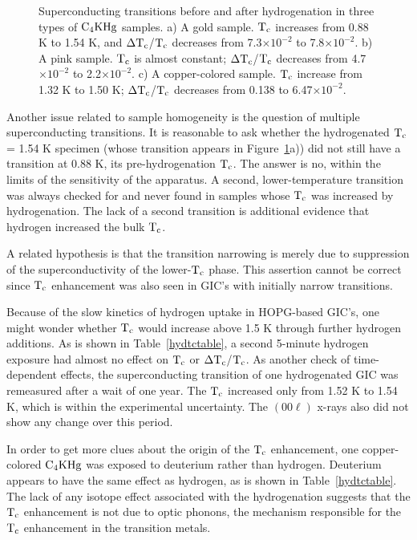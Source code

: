 \begin{figure}
\vspace{20cm}
\caption[Superconducting transitions before and after hydrogenation in $\rm
C_4KHg$]{Superconducting  transitions before  and  after  hydrogenation  in
three  types  of  $\rm C_4KHg$  samples.   a)  A  gold  sample.   $\rm T_c$
increases from 0.88 K to 1.54 K,  and  $\rm \Delta T_c$/$\rm T_c$ decreases
from 7.3$\times 10^{-2}$ to 7.8$\times 10^{-2}$.  b) A pink sample.  $\rm
T_c$  is  almost  constant; $\rm   \Delta  T_c$/$\rm   T_c$ decreases  from
4.7$\times 10^{-2}$ to 2.2$\times  10^{-2}$.  c) A copper-colored sample.
$\rm T_c$ increase   from 1.32 K  to 1.50  K;  $\rm  \Delta  T_c$/$\rm T_c$
decreases from 0.138 to 6.47$\times 10^{-2}$.}
\label{hydeffect}
\end{figure}

        Another  issue related to sample  homogeneity  is  the question  of
multiple superconducting transitions.  It is  reasonable to ask whether the
hydrogenated $\rm T_c$  = 1.54  K  specimen  (whose transition  appears  in
Figure~\ref{hydeffect}a))  did not still  have  a transition at 0.88 K, its
pre-hydrogenation  $\rm T_c$.  The  answer is no, within  the limits of the
sensitivity of  the apparatus.  A second, lower-temperature  transition was
always checked for and never found in samples whose $\rm T_c$ was increased
by hydrogenation.  The lack  of  a second transition is additional evidence
that hydrogen increased the bulk $\rm T_c$.

        A related hypothesis is that the transition narrowing is merely due
to suppression of the superconductivity of the lower-$\rm T_c$ phase.  This
assertion cannot be  correct since $\rm T_c$  enhancement was also  seen in
GIC's with initially narrow transitions.

        Because   of  the slow kinetics   of  hydrogen uptake in HOPG-based
GIC's,  one might  wonder whether $\rm  T_c$ would  increase   above 1.5  K
through further hydrogen additions.  As is shown in Table~\ref{hydtctable},
a second 5-minute  hydrogen exposure had  almost no effect  on $\rm T_c$ or
$\rm \Delta T_c$/$\rm T_c$.   As  another check  of time-dependent effects,
the superconducting transition of one hydrogenated GIC was remeasured after
a wait of one year.  The $\rm  T_c$ increased only  from 1.52 K  to 1.54 K,
which  is within the experimental  uncertainty.  The $(00\ell)$ x-rays also
did not show any change over this period.

        In order   to get more  clues  about the  origin  of the  $\rm T_c$
enhancement,  one copper-colored  $\rm  C_4KHg$  was  exposed  to deuterium
rather than  hydrogen.  Deuterium  appears    to have the  same effect   as
hydrogen, as is shown in Table~\ref{hydtctable}.   The lack of  any isotope
effect associated  with  the  hydrogenation suggests that   the  $\rm  T_c$
enhancement is not due to optic phonons, the mechanism  responsible for the
$\rm T_c$ enhancement in the transition metals.\cite{economou81}

